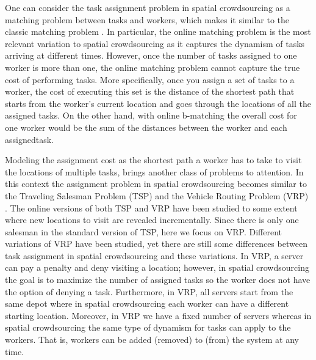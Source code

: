 One can consider the task assignment problem in spatial crowdsourcing as a matching problem between tasks and workers, which makes it similar to the classic matching problem \cite{Gibbons85,Avis83}. In particular, the online matching problem \cite{Kalyanasundaram93, Kalyanasundaram00} is the most relevant variation to spatial crowdsourcing as it captures the dynamism of tasks arriving at different times. However, once the number of tasks assigned to one worker is more than one, the online matching problem cannot capture the true cost of performing tasks. More specifically, once you assign a set of tasks to a worker, the cost of executing this set is the distance of the shortest path that starts from the worker’s current location and goes through the locations of all the assigned tasks. On the other hand, with online b-matching \cite{Kalyanasundaram00} the overall cost for one worker would be the sum of the distances between the worker and each assignedtask.

Modeling the assignment cost as the shortest path a worker has to take to visit the locations of multiple tasks, brings another class of problems to attention. In this context the assignment problem in spatial crowdsourcing becomes similar to the Traveling Salesman Problem (TSP) \cite{Lawler85} and the Vehicle Routing Problem (VRP) \cite{Toth02}. The online versions of both TSP and VRP have been studied to some extent where new locations to visit are revealed incrementally. Since there is only one salesman in the standard version of TSP, here we focus on VRP. Different variations of VRP have been studied, yet there are still some differences between task assignment in spatial crowdsourcing and these variations. In VRP, a server can pay a penalty and deny visiting a location; however, in spatial crowdsourcing the goal is to maximize the number of assigned tasks so the worker does not have the option of denying a task. Furthermore, in VRP, all servers start from the same depot where in spatial crowdsourcing each worker can have a different starting location. Moreover, in VRP we have a fixed number of servers whereas in spatial crowdsourcing the same type of dynamism for tasks can apply to the workers. That is, workers can be added (removed) to (from) the system at any time.

